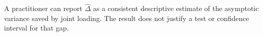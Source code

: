 A practitioner can report \(\widehat\Delta\) as a consistent descriptive estimate of the asymptotic variance saved by joint loading. The result does not justify a test or confidence interval for that gap.